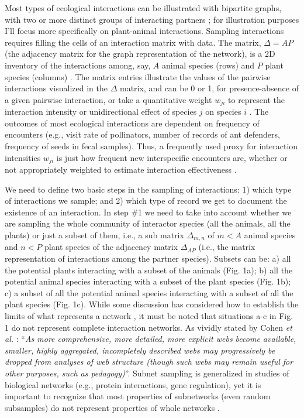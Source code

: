 \documentclass[12pt]{article}
\begin{document}
Most types of ecological interactions can be illustrated with bipartite graphs, with two or more distinct groups of interacting partners \citep{Bascompte:2014to}; for illustration purposes I'll focus more specifically on plant-animal interactions. Sampling interactions requires filling the cells of an interaction matrix with data. The matrix, $\Delta= AP$ (the adjacency matrix for the graph representation of the network), is a 2D inventory of the interactions among, say, $A$ animal species (rows) and $P$ plant species (columns) \citep{E31/2562,Bascompte:2014to}. The matrix entries illustrate the values of the pairwise interactions visualized in the $\Delta$ matrix, and can be 0 or 1, for presence-absence of a given pairwise interaction, or take a quantitative weight $w_{ji}$ to represent the interaction intensity or unidirectional effect of species $j$ on species $i$ \citep{Bascompte:2014to,Vazquez:2015ec}. The outcomes of most ecological interactions are dependent on frequency of encounters (e.g., visit rate of pollinators, number of records of ant defenders, frequency of seeds in fecal samples). Thus, a frequently used proxy for interaction intensities $w_{ji}$ is just how frequent new interspecific encounters are, whether or not appropriately weighted to estimate interaction effectiveness \citep{Vazquez:2005}. 

We need to define two basic steps in the sampling of interactions: 1) which type of interactions we sample; and 2) which type of record we get to document the existence of an interaction. In step \#1 we need to take into account whether we are sampling the whole community of interactor species (all the animals, all the plants) or just a subset of them, i.e., a sub matrix $\Delta_{m,n}$ of $m < A$ animal species and $n <  P$ plant species of the adjacency matrix $\Delta_{AP}$ (i.e., the matrix representation of interactions among the partner species). Subsets can be: a) all the potential plants interacting with a subset of the animals (Fig. 1a); b) all the potential animal species interacting with a subset of the plant species (Fig. 1b); c) a subset of all the potential animal species interacting with a subset of all the plant species (Fig. 1c). While some discussion has considered how to establish the limits of what represents a network \citep{Strogatz:2001wc} \citep[in analogy to discussion on food-web limits;][]{Cohen:1978}, it must be noted that situations a-c in Fig. 1 do not represent complete interaction networks. As vividly stated by Cohen \emph{et al.} \citeyearpar{Cohen:1993aa}: ``\emph{As more comprehensive, more detailed, more explicit webs become available, smaller, highly aggregated, incompletely described webs may progressively be dropped from analyses of web structure (though such webs may remain useful for other purposes, such as pedagogy)}''. Subnet sampling is generalized in studies of biological networks (e.g., protein interactions, gene regulation), yet it is important to recognize that most properties of subnetworks (even random subsamples) do not represent properties of whole networks \citep{Stumpf:2005tn}. 
\end{document}
